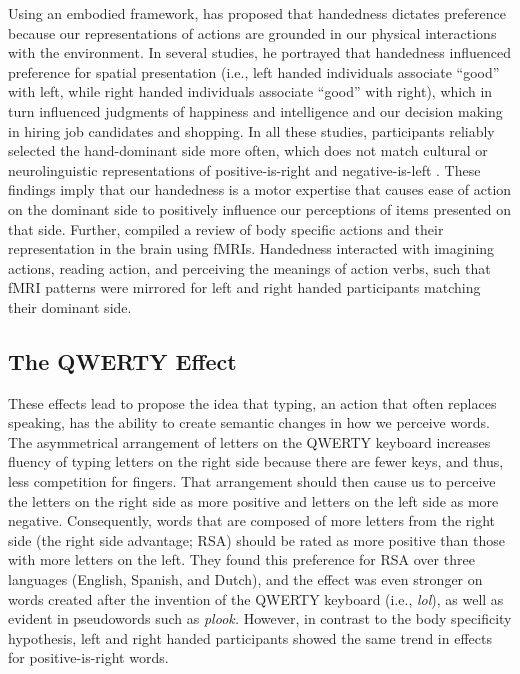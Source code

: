 \documentclass[english,man,man,mask]{apa6}
\theoremstyle{definition}
\theoremstyle{definition}
\theoremstyle{definition}
\theoremstyle{remark}
\begin{document}
Using an embodied framework, \textcite{Casasanto2009} has proposed that
handedness dictates preference because our representations of actions
are grounded in our physical interactions with the environment. In
several studies, he portrayed that handedness influenced preference for
spatial presentation (i.e., left handed individuals associate
\enquote{good} with left, while right handed individuals associate
\enquote{good} with right), which in turn influenced judgments of
happiness and intelligence and our decision making in hiring job
candidates and shopping. In all these studies, participants reliably
selected the hand-dominant side more often, which does not match
cultural or neurolinguistic representations of positive-is-right and
negative-is-left \autocite{Davidson1992}. These findings imply that our
handedness is a motor expertise that causes ease of action on the
dominant side to positively influence our perceptions of items presented
on that side. Further, \textcite{Casasanto2011} compiled a review of
body specific actions and their representation in the brain using fMRIs.
Handedness interacted with imagining actions, reading action, and
perceiving the meanings of action verbs, such that fMRI patterns were
mirrored for left and right handed participants matching their dominant
side.

\subsection{The QWERTY Effect}\label{the-qwerty-effect}

These effects lead \textcite{Jasmin2012} to propose the idea that
typing, an action that often replaces speaking, has the ability to
create semantic changes in how we perceive words. The asymmetrical
arrangement of letters on the QWERTY keyboard increases fluency of
typing letters on the right side because there are fewer keys, and thus,
less competition for fingers. That arrangement should then cause us to
perceive the letters on the right side as more positive and letters on
the left side as more negative. Consequently, words that are composed of
more letters from the right side (the right side advantage; RSA) should
be rated as more positive than those with more letters on the left. They
found this preference for RSA over three languages (English, Spanish,
and Dutch), and the effect was even stronger on words created after the
invention of the QWERTY keyboard (i.e., \emph{lol}), as well as evident
in pseudowords such as \emph{plook.} However, in contrast to the body
specificity hypothesis, left and right handed participants showed the
same trend in effects for positive-is-right words.
\end{document}
